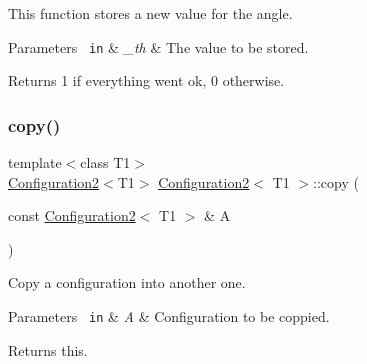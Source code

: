 This function stores a new value for the angle. 


\begin{DoxyParams}[1]{Parameters}
\mbox{\texttt{ in}}  & {\em \+\_\+th} & The value to be stored. \\
\hline
\end{DoxyParams}
\begin{DoxyReturn}{Returns}
1 if everything went ok, 0 otherwise. 
\end{DoxyReturn}
\mbox{\label{class_configuration2_a8b0bb9f80a69ff8d70af39adf97ceb46}} 
\subsubsection{\texorpdfstring{copy()}{copy()}}
{\footnotesize\ttfamily template$<$class T1$>$ \\
\mbox{\hyperlink{class_configuration2}{Configuration2}}$<$T1$>$ \mbox{\hyperlink{class_configuration2}{Configuration2}}$<$ T1 $>$\+::copy (\begin{DoxyParamCaption}\item[{const \mbox{\hyperlink{class_configuration2}{Configuration2}}$<$ T1 $>$ \&}]{A }\end{DoxyParamCaption})\hspace{0.3cm}{\ttfamily [inline]}}



Copy a configuration into another one. 


\begin{DoxyParams}[1]{Parameters}
\mbox{\texttt{ in}}  & {\em A} & Configuration to be coppied. \\
\hline
\end{DoxyParams}
\begin{DoxyReturn}{Returns}
this. 
\end{DoxyReturn}
\mbox{\label{class_configuration2_a5cf4a74b6fe52cd7d8c9ff8472ff2df9}} 
